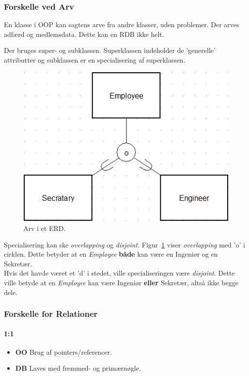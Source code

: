 \subsubsection{Forskelle ved Arv}\label{sec:arv}
En klasse i OOP kan sagtens arve fra andre klasser, uden problemer. Der arves adfærd og medlemsdata. Dette kan en RDB ikke helt.

Der bruges super- og subklassen. Superklassen indeholder de 'generelle' attributter og subklassen er en specialisering af superklassen.

\begin{figure}[H]
\centering
\includegraphics[width=0.5\linewidth]{figs/spm3/arv}
\caption{Arv i et ERD. }
\label{fig:arv}
\end{figure}

Specialisering kan ske \textit{overlapping} og \textit{disjoint}. 
Figur~\ref{fig:arv} viser \textit{overlapping} med 'o' i cirklen. Dette betyder at en \textit{Employee} \textbf{både} kan være en Ingeniør og en Sekretær.\\

Hvis det havde været et 'd' i stedet, ville specialiseringen være \textit{disjoint}. Dette ville betyde at en \textit{Employee} kan være Ingeniør \textbf{eller} Sekretær, altså ikke begge dele. 


\subsubsection{Forskelle for Relationer}

\paragraph{1:1}

\begin{itemize}
	\item \textbf{OO}
	Brug af pointers/referencer.
	\item \textbf{DB}
	Laves med fremmed- og primærnøgle.
\end{itemize}

